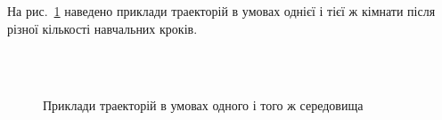 На рис.~\ref{fig:learning-samples} наведено приклади траекторій в умовах однієї і тієї ж кімнати після різної кількості навчальних кроків.
\begin{figure}
  \centering
  \,
   \\
  \,
  \caption{Приклади траекторій в умовах одного і того ж середовища}
  \label{fig:learning-samples}
\end{figure}

